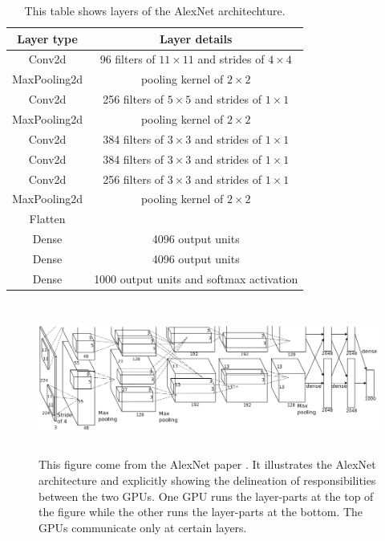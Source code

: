 \documentclass[11pt]{report}
\begin{document}
\begin{table}[h!]\label{table:alexnet}
\centering
\begin{tabular}{  c  c  }
Layer type & Layer details\\
\hline
Conv2d & 96 filters of $11\times11$ and strides of $4\times4$ \\
MaxPooling2d & pooling kernel of $2\times2$ \\
Conv2d & 256 filters of $5\times5$ and strides of $1\times1$ \\
MaxPooling2d & pooling kernel of $2\times2$ \\
Conv2d & 384 filters of $3\times3$ and strides of $1\times1$ \\
Conv2d & 384 filters of $3\times3$ and strides of $1\times1$ \\
Conv2d & 256 filters of $3\times3$ and strides of $1\times1$ \\
MaxPooling2d & pooling kernel of $2\times2$ \\
Flatten & \\
Dense & 4096 output units \\
Dense & 4096 output units \\
Dense & 1000 output units and softmax activation
\end{tabular}
\caption[AlexNet architecture]{This table shows layers of the AlexNet architechture.}
\end{table}

\begin{figure}[h]\label{fig:alexnet}
\centering
\includegraphics[width=15cm, height=5cm]{alexnet}
\caption[AlexNet architecture]{This figure come from the AlexNet paper \cite{DBLP:journals/cacm/KrizhevskySH17}. It illustrates the AlexNet architecture and explicitly showing the delineation of responsibilities between the two GPUs. One GPU runs the layer-parts at the top of the figure while the other runs the layer-parts at the bottom. The GPUs communicate only at certain layers.}
\end{figure}
\end{document}
